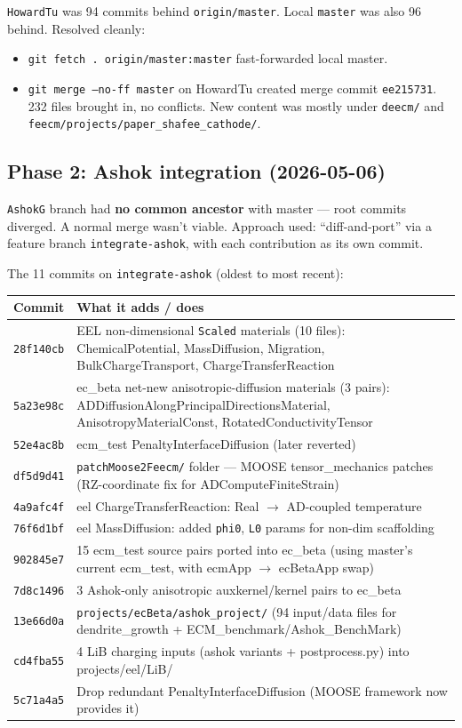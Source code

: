 \documentclass[11pt,letterpaper]{article}
\newenvironment{tightitemize}{\begin{itemize}\setlength\itemsep{0pt}\setlength\parsep{0pt}}{\end{itemize}}
\newcommand{\code}[1]{\texttt{\small #1}}
\begin{document}
\code{HowardTu} was 94 commits behind \code{origin/master}. Local \code{master}
was also 96 behind. Resolved cleanly:
\begin{tightitemize}
  \item \code{git fetch . origin/master:master} fast-forwarded local master.
  \item \code{git merge --no-ff master} on HowardTu created merge commit \code{ee215731}.
    232 files brought in, no conflicts. New content was mostly under \code{deecm/}
    and \code{feecm/projects/paper\_shafee\_cathode/}.
\end{tightitemize}

\subsection{Phase 2: Ashok integration (2026-05-06)}

\code{AshokG} branch had \textbf{no common ancestor} with master --- root commits
diverged. A normal merge wasn't viable. Approach used: ``diff-and-port'' via a
feature branch \code{integrate-ashok}, with each contribution as its own commit.

The 11 commits on \code{integrate-ashok} (oldest to most recent):

\begin{longtable}{l p{}}
\toprule
Commit & What it adds / does \\
\midrule
\endhead
\code{28f140cb} & EEL non-dimensional \code{*Scaled} materials (10 files): ChemicalPotential, MassDiffusion, Migration, BulkChargeTransport, ChargeTransferReaction \\
\code{5a23e98c} & ec\_beta net-new anisotropic-diffusion materials (3 pairs): ADDiffusionAlongPrincipalDirectionsMaterial, AnisotropyMaterialConst, RotatedConductivityTensor \\
\code{52e4ac8b} & ecm\_test PenaltyInterfaceDiffusion (later reverted) \\
\code{df5d9d41} & \code{patchMoose2Feecm/} folder --- MOOSE tensor\_mechanics patches (RZ-coordinate fix for ADComputeFiniteStrain) \\
\code{4a9afc4f} & eel ChargeTransferReaction: Real $\to$ AD-coupled temperature \\
\code{76f6d1bf} & eel MassDiffusion: added \code{phi0}, \code{L0} params for non-dim scaffolding \\
\code{902845e7} & 15 ecm\_test source pairs ported into ec\_beta (using master's current ecm\_test, with ecmApp $\to$ ecBetaApp swap) \\
\code{7d8c1496} & 3 Ashok-only anisotropic auxkernel/kernel pairs to ec\_beta \\
\code{13e66d0a} & \code{projects/ecBeta/ashok\_project/} (94 input/data files for dendrite\_growth + ECM\_benchmark/Ashok\_BenchMark) \\
\code{cd4fba55} & 4 LiB charging inputs (ashok variants + postprocess.py) into projects/eel/LiB/ \\
\code{5c71a4a5} & Drop redundant PenaltyInterfaceDiffusion (MOOSE framework now provides it) \\
\bottomrule
\end{longtable}
\end{document}
